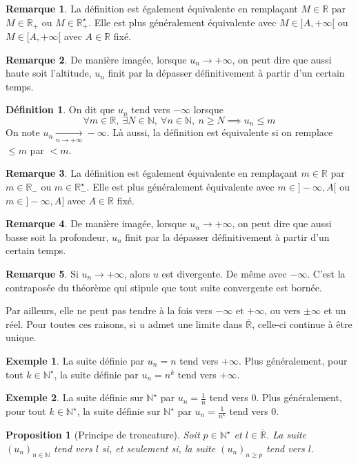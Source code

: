 \documentclass[french]{book}
\newcommand{\N}{\mathbb{N}}
\newcommand{\R}{\mathbb{R}}
\newcommand{\st}{^\star}
\theoremstyle{plain}
\newtheorem{prop}{Proposition}[chapter]
\theoremstyle{definition}
\newtheorem{dfn}{Définition}[chapter]
\newtheorem{exa}{Exemple}[chapter]
\newtheorem{rmq}{Remarque}[chapter]
\theoremstyle{remark}
\begin{document}
\begin{rmq}
	La définition est également équivalente en remplaçant $M\in\R$ par $M\in\R_+$ ou $M\in\R_+\st$. Elle est plus généralement équivalente avec $M\in]A,+\infty[$ ou $M\in[A,+\infty[$ avec $A\in\R$ fixé.
\end{rmq}
\begin{rmq}
	De manière imagée, lorsque $u_n\rightarrow +\infty$, on peut dire que aussi haute soit l'altitude, $u_n$ finit par la dépasser définitivement à partir d'un certain temps.
\end{rmq}
\begin{dfn}
	On dit que $u_n$ tend vers $-\infty$ lorsque $$\forall m\in\R,\ \exists N\in\N,\ \forall n\in\N,\ n\geqslant N\implies u_n\leqslant m$$ On note $u_n\xrightarrow[n\to+\infty]{}-\infty$. Là aussi, la définition est équivalente si on remplace $\leqslant m$ par $<m$.
\end{dfn}
\begin{rmq}
	La définition est également équivalente en remplaçant $m\in\R$ par $m\in\R_-$ ou $m\in\R_-\st$. Elle est plus généralement équivalente avec $m\in]-\infty,A[$ ou $m\in]-\infty,A]$ avec $A\in\R$ fixé.
\end{rmq}
\begin{rmq}
	De manière imagée, lorsque $u_n\rightarrow +\infty$, on peut dire que aussi basse soit la profondeur, $u_n$ finit par la dépasser définitivement à partir d'un certain temps.
\end{rmq}
\begin{rmq}
	Si $u_n\rightarrow+\infty$, alors $u$ est divergente. De même avec $-\infty$. C'est la contraposée du théorème qui stipule que tout suite convergente est bornée.
\end{rmq}
Par ailleurs, elle ne peut pas tendre à la fois vers $-\infty$ et $+\infty$, ou vers $\pm\infty$ et un réel. Pour toutes ces raisons, si $u$ admet une limite dans $\overline{\R}$, celle-ci continue à être unique.
\begin{exa}
	La suite définie par $u_n=n$ tend vers $+\infty$. Plus généralement, pour tout $k\in\N\st$, la suite définie par $u_n=n^k$ tend vers $+\infty$.
\end{exa}
\begin{exa}
	La suite définie sur $\N\st$ par $u_n=\displaystyle\frac1n$ tend vers $0$. Plus généralement, pour tout $k\in\N\st$, la suite définie sur $\N\st$ par $u_n=\displaystyle\frac{1}{n^k}$ tend vers $0$.
\end{exa}
\begin{prop}[Principe de troncature]
	Soit $p\in\N\st$ et $l\in\overline{\R}$. La suite $(u_n)_{n\in\N}$ tend vers $l$ si, et seulement si, la suite $(u_n)_{n\geqslant p}$ tend vers $l$.
\end{prop}
\end{document}
